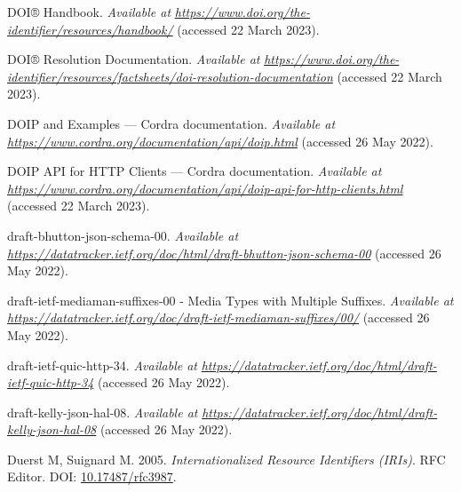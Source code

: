 \begin{CSLReferences}{1}{0}
\leavevmode{}%
DOI® Handbook. \emph{Available at} \href{https://www.doi.org/the-identifier/resources/handbook/}{\emph{https://www.doi.org/the-identifier/resources/handbook/}} (accessed 22 March 2023).

\leavevmode{}%
DOI® Resolution Documentation. \emph{Available at} \href{https://www.doi.org/the-identifier/resources/factsheets/doi-resolution-documentation}{\emph{https://www.doi.org/the-identifier/resources/factsheets/doi-resolution-documentation}} (accessed 22 March 2023).

\leavevmode{}%
DOIP and Examples --- Cordra documentation. \emph{Available at} \href{https://www.cordra.org/documentation/api/doip.html}{\emph{https://www.cordra.org/documentation/api/doip.html}} (accessed 26 May 2022).

\leavevmode{}%
DOIP API for HTTP Clients --- Cordra documentation. \emph{Available at} \href{https://www.cordra.org/documentation/api/doip-api-for-http-clients.html}{\emph{https://www.cordra.org/documentation/api/doip-api-for-http-clients.html}} (accessed 22 March 2023).

\leavevmode{}%
draft-bhutton-json-schema-00. \emph{Available at} \href{https://datatracker.ietf.org/doc/html/draft-bhutton-json-schema-00}{\emph{https://datatracker.ietf.org/doc/html/draft-bhutton-json-schema-00}} (accessed 26 May 2022).

\leavevmode{}%
draft-ietf-mediaman-suffixes-00 - Media Types with Multiple Suffixes. \emph{Available at} \href{https://datatracker.ietf.org/doc/draft-ietf-mediaman-suffixes/00/}{\emph{https://datatracker.ietf.org/doc/draft-ietf-mediaman-suffixes/00/}} (accessed 26 May 2022).

\leavevmode{}%
draft-ietf-quic-http-34. \emph{Available at} \href{https://datatracker.ietf.org/doc/html/draft-ietf-quic-http-34}{\emph{https://datatracker.ietf.org/doc/html/draft-ietf-quic-http-34}} (accessed 26 May 2022).

\leavevmode{}%
draft-kelly-json-hal-08. \emph{Available at} \href{https://datatracker.ietf.org/doc/html/draft-kelly-json-hal-08}{\emph{https://datatracker.ietf.org/doc/html/draft-kelly-json-hal-08}} (accessed 26 May 2022).

\leavevmode{}%
Duerst M, Suignard M. 2005. \emph{Internationalized Resource Identifiers (IRIs)}. RFC Editor. DOI: \href{https://doi.org/10.17487/rfc3987}{10.17487/rfc3987}.


\end{CSLReferences}
